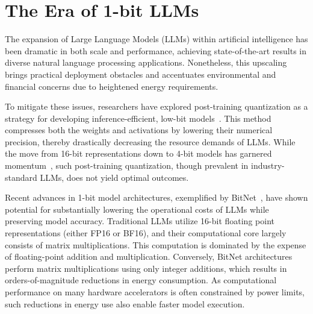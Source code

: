 \begin{abstract}
Recent advancements, exemplified by BitNet~\cite{bitnet}, are ushering in a new generation of 1-bit Large Language Models (LLMs). Here, we present a new 1-bit LLM model, designated as \textbf{}, wherein each parameter of the model adopts a ternary value from the set \{-1, 0, 1\}. This approach achieves performance parity with full-precision Transformer LLMs—whether FP16 or BF16—in terms of perplexity and end-task results, provided equivalent model scale and training data. Importantly, this design offers substantial improvements in latency, memory usage, throughput, and energy efficiency. Notably, the 1.58-bit LLM formulation establishes a new paradigm for scaling laws and methodologies in LLM training, balancing both efficiency and performance. Additionally, it points to innovative avenues for computation, fostering the development of hardware specialized for 1-bit LLM operations.
\end{abstract}

\section{The Era of 1-bit LLMs}

The expansion of Large Language Models (LLMs) within artificial intelligence has been dramatic in both scale and performance, achieving state-of-the-art results in diverse natural language processing applications. Nonetheless, this upscaling brings practical deployment obstacles and accentuates environmental and financial concerns due to heightened energy requirements.

To mitigate these issues, researchers have explored post-training quantization as a strategy for developing inference-efficient, low-bit models~\cite{smoothquant, gptq, quip, quip_sharp}. This method compresses both the weights and activations by lowering their numerical precision, thereby drastically decreasing the resource demands of LLMs. While the move from 16-bit representations down to 4-bit models has garnered momentum~\cite{gptq, awq}, such post-training quantization, though prevalent in industry-standard LLMs, does not yield optimal outcomes.

Recent advances in 1-bit model architectures, exemplified by BitNet~\cite{bitnet}, have shown potential for substantially lowering the operational costs of LLMs while preserving model accuracy. Traditional LLMs utilize 16-bit floating point representations (either FP16 or BF16), and their computational core largely consists of matrix multiplications. This computation is dominated by the expense of floating-point addition and multiplication. Conversely, BitNet architectures perform matrix multiplications using only integer additions, which results in orders-of-magnitude reductions in energy consumption. As computational performance on many hardware accelerators is often constrained by power limits, such reductions in energy use also enable faster model execution.

